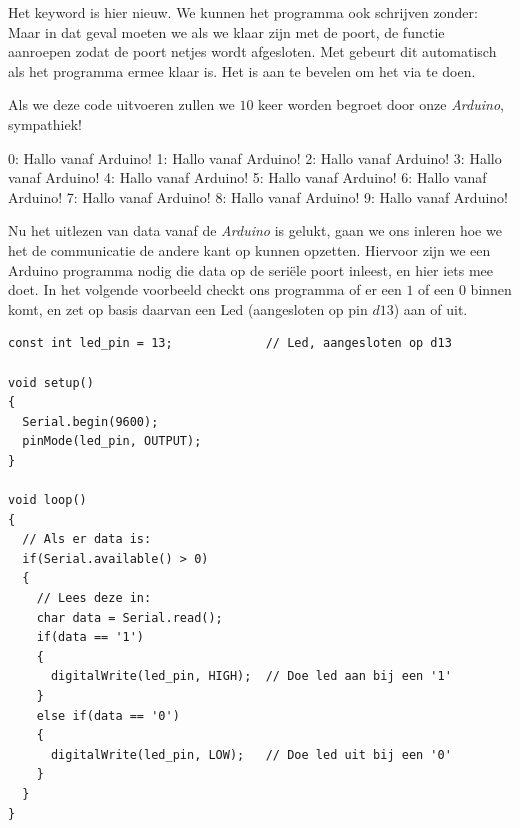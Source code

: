 Het keyword  is hier nieuw. We kunnen het programma ook schrijven zonder:
Maar in dat geval moeten we als we klaar zijn met de poort, de functie  aanroepen zodat de poort netjes wordt afgesloten. Met  gebeurt dit automatisch als het programma ermee klaar is. Het is aan te bevelen om het via  te doen. \newline

Als we deze code uitvoeren zullen we $10$ keer worden begroet door onze \textit{Arduino}, sympathiek!
\begin{python}
0: Hallo vanaf Arduino!
1: Hallo vanaf Arduino!
2: Hallo vanaf Arduino!
3: Hallo vanaf Arduino!
4: Hallo vanaf Arduino!
5: Hallo vanaf Arduino!
6: Hallo vanaf Arduino!
7: Hallo vanaf Arduino!
8: Hallo vanaf Arduino!
9: Hallo vanaf Arduino!
\end{python}


Nu het uitlezen van data vanaf de \textit{Arduino} is gelukt, gaan we ons inleren hoe we het de communicatie de andere kant op kunnen opzetten. Hiervoor zijn we een Arduino programma nodig die data op de seriële poort inleest, en hier iets mee doet. In het volgende voorbeeld checkt ons programma of er een $1$ of een $0$ binnen komt, en zet op basis daarvan een Led (aangesloten op pin $d13$) aan of uit. 

\newpage 

\begin{lstlisting}[language=Arduino]
const int led_pin = 13;             // Led, aangesloten op d13

void setup() 
{
  Serial.begin(9600);
  pinMode(led_pin, OUTPUT);
}

void loop() 
{
  // Als er data is:
  if(Serial.available() > 0)
  {
    // Lees deze in:
    char data = Serial.read();
    if(data == '1')
    {
      digitalWrite(led_pin, HIGH);  // Doe led aan bij een '1'
    }
    else if(data == '0')
    {
      digitalWrite(led_pin, LOW);   // Doe led uit bij een '0'
    }
  }
}
\end{lstlisting}

